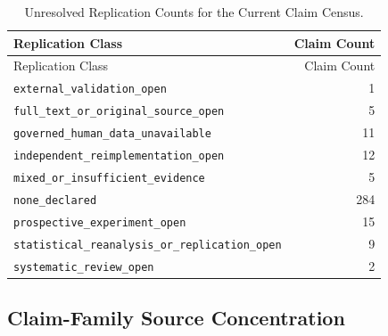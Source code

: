 \documentclass[
  letterpaper,
]{report}
\begin{document}
\begin{longtable}[]{@{}lr@{}}
\caption{Unresolved Replication Counts for the Current Claim
Census.}\label{tbl-claim-replication}\tabularnewline
\toprule\noalign{}
Replication Class & Claim Count \\
\midrule\noalign{}
\endfirsthead
\toprule\noalign{}
Replication Class & Claim Count \\
\midrule\noalign{}
\endhead
\bottomrule\noalign{}
\endlastfoot
\texttt{external\_validation\_open} & 1 \\
\texttt{full\_text\_or\_original\_source\_open} & 5 \\
\texttt{governed\_human\_data\_unavailable} & 11 \\
\texttt{independent\_reimplementation\_open} & 12 \\
\texttt{mixed\_or\_insufficient\_evidence} & 5 \\
\texttt{none\_declared} & 284 \\
\texttt{prospective\_experiment\_open} & 15 \\
\texttt{statistical\_reanalysis\_or\_replication\_open} & 9 \\
\texttt{systematic\_review\_open} & 2 \\
\end{longtable}

\newpage

\subsection{Claim-Family Source
Concentration}\label{claim-family-source-concentration}
\end{document}
